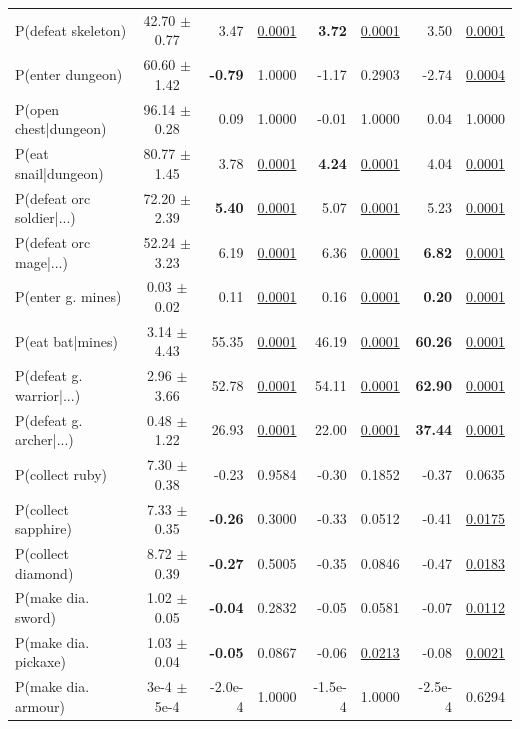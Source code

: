 \documentclass[final]{nesy2026}
\newcommand{\uu}[1]{\underline{#1}}
\newcommand{\bb}[1]{\textbf{#1}}
\begin{document}
\begin{table}[htbp]
\begin{tabular}{lcrcrcrc}
P(defeat skeleton)       & 42.70 $\pm$ 0.77 &      3.47  & \uu{0.0001}&  \bb{3.72} & \uu{0.0001}&      3.50  & \uu{0.0001}\\
P(enter dungeon)         & 60.60 $\pm$ 1.42 & \bb{-0.79} &     1.0000 &     -1.17  &     0.2903 &     -2.74  & \uu{0.0004}\\
P(open chest|dungeon)    & 96.14 $\pm$ 0.28 &      0.09  &     1.0000 &     -0.01  &     1.0000 &      0.04  &     1.0000 \\
P(eat snail|dungeon)     & 80.77 $\pm$ 1.45 &      3.78  & \uu{0.0001}&  \bb{4.24} & \uu{0.0001}&      4.04  & \uu{0.0001}\\
P(defeat orc soldier|...)& 72.20 $\pm$ 2.39 &  \bb{5.40} & \uu{0.0001}&      5.07  & \uu{0.0001}&      5.23  & \uu{0.0001}\\
P(defeat orc mage|...)   & 52.24 $\pm$ 3.23 &      6.19  & \uu{0.0001}&      6.36  & \uu{0.0001}&  \bb{6.82} & \uu{0.0001}\\
P(enter g. mines)        &  0.03 $\pm$ 0.02 &      0.11  & \uu{0.0001}&      0.16  & \uu{0.0001}&  \bb{0.20} & \uu{0.0001}\\
P(eat bat|mines)         &  3.14 $\pm$ 4.43 &     55.35  & \uu{0.0001}&     46.19  & \uu{0.0001}& \bb{60.26} & \uu{0.0001}\\
P(defeat g. warrior|...) &  2.96 $\pm$ 3.66 &     52.78  & \uu{0.0001}&     54.11  & \uu{0.0001}& \bb{62.90} & \uu{0.0001}\\
P(defeat g. archer|...)  &  0.48 $\pm$ 1.22 &     26.93  & \uu{0.0001}&     22.00  & \uu{0.0001}& \bb{37.44} & \uu{0.0001}\\
P(collect ruby)          &  7.30 $\pm$ 0.38 &     -0.23  &     0.9584 &     -0.30  &     0.1852 &     -0.37  &     0.0635 \\
P(collect sapphire)      &  7.33 $\pm$ 0.35 & \bb{-0.26} &     0.3000 &     -0.33  &     0.0512 &     -0.41  & \uu{0.0175}\\
P(collect diamond)       &  8.72 $\pm$ 0.39 & \bb{-0.27} &     0.5005 &     -0.35  &     0.0846 &     -0.47  & \uu{0.0183}\\
P(make dia. sword)       &  1.02 $\pm$ 0.05 & \bb{-0.04} &     0.2832 &     -0.05  &     0.0581 &     -0.07  & \uu{0.0112}\\
P(make dia. pickaxe)     &  1.03 $\pm$ 0.04 & \bb{-0.05} &     0.0867 &     -0.06  & \uu{0.0213}&     -0.08  & \uu{0.0021}\\
P(make dia. armour)      &  3e-4 $\pm$ 5e-4 &   -2.0e-4  &     1.0000 &    -1.5e-4 &     1.0000 &   -2.5e-4  &     0.6294 \\
\bottomrule
\end{tabular}
\end{table}
\end{document}
